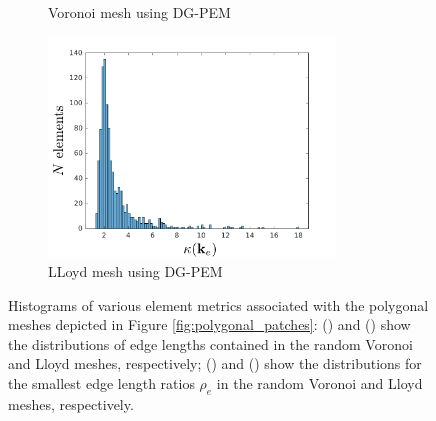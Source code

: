 \begin{figure}[!h]
\begin{subfigure}[b]{0.49\linewidth}
    			\caption{Voronoi mesh using DG-PEM \label{fig:patch_condition_number_DGPEM}}
    \end{subfigure}
	\begin{subfigure}[b]{0.49\linewidth}
            \centering
            \includegraphics[width=3.0in]{figures/lloyd_condition_number_DGPEM.pdf}
    			\caption{LLoyd mesh using DG-PEM \label{fig:lloyd_condition_number_DGPEM}}
    \end{subfigure}
    \caption{Histograms of various element metrics associated with the polygonal meshes depicted in Figure \ref{fig:polygonal_patches}:  () and () show the distributions of edge lengths contained in the random Voronoi and Lloyd meshes, respectively; () and () show the distributions for the smallest edge length ratios $\rho_e$ in the random Voronoi and Lloyd meshes, respectively.}
\end{figure}



